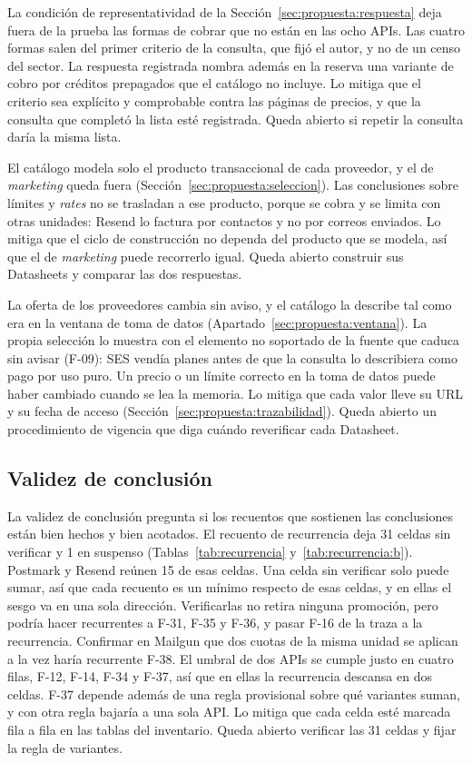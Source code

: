 La condición de representatividad de la Sección~\ref{sec:propuesta:respuesta} deja fuera de la prueba las formas de cobrar que no están en las ocho APIs.
Las cuatro formas salen del primer criterio de la consulta, que fijó el autor, y no de un censo del sector.
La respuesta registrada nombra además en la reserva una variante de cobro por créditos prepagados que el catálogo no incluye.
Lo mitiga que el criterio sea explícito y comprobable contra las páginas de precios, y que la consulta que completó la lista esté registrada.
Queda abierto si repetir la consulta daría la misma lista.

El catálogo modela solo el producto transaccional de cada proveedor, y el de \textit{marketing} queda fuera (Sección~\ref{sec:propuesta:seleccion}).
Las conclusiones sobre límites y \textit{rates} no se trasladan a ese producto, porque se cobra y se limita con otras unidades: Resend lo factura por contactos y no por correos enviados.
Lo mitiga que el ciclo de construcción no dependa del producto que se modela, así que el de \textit{marketing} puede recorrerlo igual.
Queda abierto construir sus Datasheets y comparar las dos respuestas.

La oferta de los proveedores cambia sin aviso, y el catálogo la describe tal como era en la ventana de toma de datos (Apartado~\ref{sec:propuesta:ventana}).
La propia selección lo muestra con el elemento no soportado de la fuente que caduca sin avisar (F-09): SES vendía planes antes de que la consulta lo describiera como pago por uso puro.
Un precio o un límite correcto en la toma de datos puede haber cambiado cuando se lea la memoria.
Lo mitiga que cada valor lleve su URL y su fecha de acceso (Sección~\ref{sec:propuesta:trazabilidad}).
Queda abierto un procedimiento de vigencia que diga cuándo reverificar cada Datasheet.

\subsection{Validez de conclusión}\label{sec:conclusiones:conclusion}

La validez de conclusión pregunta si los recuentos que sostienen las conclusiones están bien hechos y bien acotados.
El recuento de recurrencia deja 31 celdas sin verificar y 1 en suspenso (Tablas~\ref{tab:recurrencia} y~\ref{tab:recurrencia:b}).
Postmark y Resend reúnen 15 de esas celdas.
Una celda sin verificar solo puede sumar, así que cada recuento es un mínimo respecto de esas celdas, y en ellas el sesgo va en una sola dirección.
Verificarlas no retira ninguna promoción, pero podría hacer recurrentes a F-31, F-35 y F-36, y pasar F-16 de la traza a la recurrencia.
Confirmar en Mailgun que dos cuotas de la misma unidad se aplican a la vez haría recurrente F-38.
El umbral de dos APIs se cumple justo en cuatro filas, F-12, F-14, F-34 y F-37, así que en ellas la recurrencia descansa en dos celdas.
F-37 depende además de una regla provisional sobre qué variantes suman, y con otra regla bajaría a una sola API.
Lo mitiga que cada celda esté marcada fila a fila en las tablas del inventario.
Queda abierto verificar las 31 celdas y fijar la regla de variantes.

